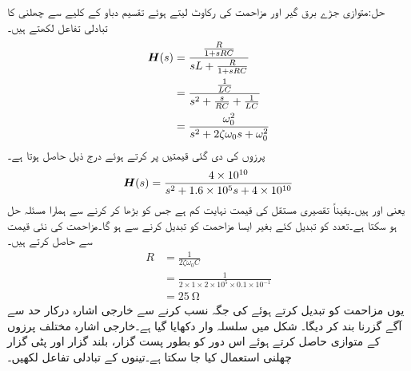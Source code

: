 حل:متوازی جڑے برق گیر اور مزاحمت کی رکاوٹ  لیتے ہوئے تقسیم دباو کے کلیے سے چھلنی کا تبادلی تفاعل لکھتے ہیں۔
\begin{align*}
{\ensuremath{{\boldsymbol{H}}}}(s)&=\frac{\frac{R}{1+sRC}}{sL+\frac{R}{1+sRC}}\\
&=\frac{\frac{1}{LC}}{s^2+\frac{s}{RC}+\frac{1}{LC}}\\
&=\frac{\omega_0^2}{s^2+2\zeta \omega_0 s +\omega_0^2}
\end{align*}
پرزوں کی دی گئی قیمتیں پر کرتے ہوئے درج ذیل حاصل ہوتا ہے۔
\begin{align*}
{\ensuremath{{\boldsymbol{H}}}}(s)=\frac{4\times 10^{10}}{s^2+1.6\times 10^5 s+4\times 10^{10}}
\end{align*}
یعنی  اور  ہیں۔یقیناً تقصیری مستقل کی قیمت نہایت کم ہے جس کو بڑھا کر  کرنے سے ہمارا مسئلہ حل ہو سکتا ہے۔تعدد کو تبدیل کئے بغیر ایسا مزاحمت کو تبدیل کرنے سے ہو گا۔مزاحمت کی نئی
 قیمت  سے حاصل کرتے ہیں۔
\begin{align*}
R&=\frac{1}{2\zeta \omega_0 C}\\
&=\frac{1}{2\times 1 \times 2\times 10^5\times 0.1\times 10^{-1}}\\
&=\SI{25}{\ohm}
\end{align*}
یوں مزاحمت کو تبدیل کرتے ہوئے  کی جگہ  نسب کرنے سے خارجی اشارہ درکار حد سے آگے گزرنا بند کر دیگا۔
شکل میں سلسلہ وار  دکھایا گیا ہے۔خارجی اشارہ مختلف پرزوں کے متوازی حاصل کرتے ہوئے اس دور کو بطور پست گزار، بلند گزار اور پٹی گزار چھلنی استعمال کیا جا سکتا ہے۔تینوں  کے تبادلی تفاعل  لکھیں۔
